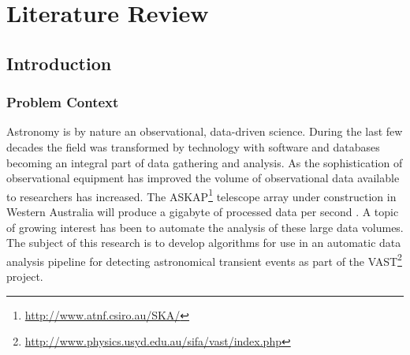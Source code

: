 


%

\chapter{Literature Review} \label{chap:litreview}


%
	\section{Introduction}
	\subsection{Problem Context}
	Astronomy is by nature an observational, data-driven science. During the last few decades the field was transformed by technology with software and databases becoming an integral part of data gathering and analysis. As the sophistication of observational equipment has improved the volume of observational data available to researchers has increased. The ASKAP\footnote{\url{http://www.atnf.csiro.au/SKA/}} telescope array under construction in Western Australia will produce a gigabyte of processed data per second . A topic of growing interest has been to automate the analysis of these large data volumes. The subject of this research is to develop algorithms for use in an automatic data analysis pipeline for detecting astronomical transient events as part of the VAST\footnote{\url{http://www.physics.usyd.edu.au/sifa/vast/index.php}} project.
